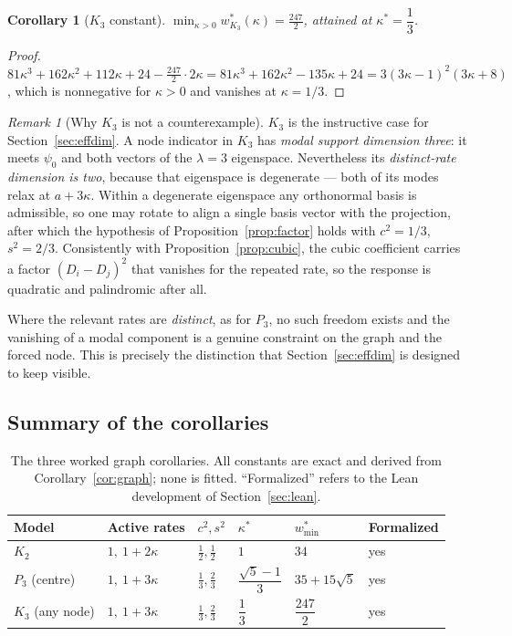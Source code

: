 \documentclass[11pt]{article}
\theoremstyle{plain}
\newtheorem{corollary}[theorem]{Corollary}
\theoremstyle{definition}
\theoremstyle{remark}
\newtheorem{remark}[theorem]{Remark}
\begin{document}
\begin{corollary}[$K_3$ constant]\label{cor:K3}
$\displaystyle\min_{\kappa>0}w^{*}_{K_3}(\kappa)=\frac{247}{2}$, attained at
$\kappa^{*}=\dfrac13$.
\end{corollary}

\begin{proof}
$81\kappa^3+162\kappa^2+112\kappa+24-\tfrac{247}{2}\cdot2\kappa
 =81\kappa^3+162\kappa^2-135\kappa+24=3(3\kappa-1)^2(3\kappa+8)$, which is nonnegative for
$\kappa>0$ and vanishes at $\kappa=1/3$.
\end{proof}

\begin{remark}[Why $K_3$ is not a counterexample]\label{rem:K3degen}
$K_3$ is the instructive case for Section~\ref{sec:effdim}. A node indicator in $K_3$ has
\emph{modal support dimension three}: it meets $\psi_0$ and both vectors of the $\lambda=3$
eigenspace. Nevertheless its \emph{distinct-rate dimension is two}, because that eigenspace is
degenerate --- both of its modes relax at $a+3\kappa$. Within a degenerate eigenspace any
orthonormal basis is admissible, so one may rotate to align a single basis vector with the
projection, after which the hypothesis of Proposition~\ref{prop:factor} holds with $c^2=1/3$,
$s^2=2/3$. Consistently with Proposition~\ref{prop:cubic}, the cubic coefficient carries a
factor $(D_i-D_j)^2$ that vanishes for the repeated rate, so the response is quadratic and
palindromic after all.

Where the relevant rates are \emph{distinct}, as for $P_3$, no such freedom exists and the
vanishing of a modal component is a genuine constraint on the graph and the forced node. This is
precisely the distinction that Section~\ref{sec:effdim} is designed to keep visible.
\end{remark}

\subsection{Summary of the corollaries}

\begin{table}[t]
\centering
\caption{The three worked graph corollaries. All constants are exact and derived from
Corollary~\ref{cor:graph}; none is fitted. ``Formalized'' refers to the Lean development of
Section~\ref{sec:lean}.}
\label{tab:corollaries}
\begin{tabular}{llllll}
\toprule
Model & Active rates & $c^2,s^2$ & $\kappa^{*}$ & $w^{*}_{\min}$ & Formalized\\
\midrule
$K_2$ & $1,\ 1+2\kappa$ & $\tfrac12,\tfrac12$ & $1$ & $34$ & yes\\
$P_3$ (centre) & $1,\ 1+3\kappa$ & $\tfrac13,\tfrac23$ & $\dfrac{\sqrt5-1}{3}$ & $35+15\sqrt5$ & yes\\
$K_3$ (any node) & $1,\ 1+3\kappa$ & $\tfrac13,\tfrac23$ & $\dfrac13$ & $\dfrac{247}{2}$ & yes\\
\bottomrule
\end{tabular}
\end{table}
\end{document}
